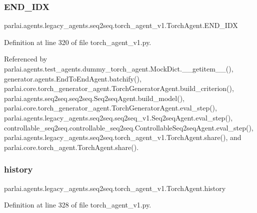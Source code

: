 \subsubsection{\texorpdfstring{E\+N\+D\+\_\+\+I\+DX}{END\_IDX}}
{\footnotesize\ttfamily parlai.\+agents.\+legacy\+\_\+agents.\+seq2seq.\+torch\+\_\+agent\+\_\+v1.\+Torch\+Agent.\+E\+N\+D\+\_\+\+I\+DX}



Definition at line 320 of file torch\+\_\+agent\+\_\+v1.\+py.



Referenced by parlai.\+agents.\+test\+\_\+agents.\+dummy\+\_\+torch\+\_\+agent.\+Mock\+Dict.\+\_\+\+\_\+getitem\+\_\+\+\_\+(), generator.\+agents.\+End\+To\+End\+Agent.\+batchify(), parlai.\+core.\+torch\+\_\+generator\+\_\+agent.\+Torch\+Generator\+Agent.\+build\+\_\+criterion(), parlai.\+agents.\+seq2seq.\+seq2seq.\+Seq2seq\+Agent.\+build\+\_\+model(), parlai.\+core.\+torch\+\_\+generator\+\_\+agent.\+Torch\+Generator\+Agent.\+eval\+\_\+step(), parlai.\+agents.\+legacy\+\_\+agents.\+seq2seq.\+seq2seq\+\_\+v1.\+Seq2seq\+Agent.\+eval\+\_\+step(), controllable\+\_\+seq2seq.\+controllable\+\_\+seq2seq.\+Controllable\+Seq2seq\+Agent.\+eval\+\_\+step(), parlai.\+agents.\+legacy\+\_\+agents.\+seq2seq.\+torch\+\_\+agent\+\_\+v1.\+Torch\+Agent.\+share(), and parlai.\+core.\+torch\+\_\+agent.\+Torch\+Agent.\+share().

\mbox{\label{classparlai_1_1agents_1_1legacy__agents_1_1seq2seq_1_1torch__agent__v1_1_1TorchAgent_a858bd7d01a3d6298f2e2f72efcf73953}} 
\subsubsection{\texorpdfstring{history}{history}}
{\footnotesize\ttfamily parlai.\+agents.\+legacy\+\_\+agents.\+seq2seq.\+torch\+\_\+agent\+\_\+v1.\+Torch\+Agent.\+history}



Definition at line 328 of file torch\+\_\+agent\+\_\+v1.\+py.



